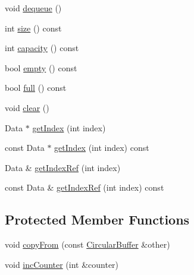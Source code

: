 \begin{CompactItemize}
\item 
void \hyperlink{class_j_g_t_l_1_1_circular_buffer_cd22f74b9be2e34fa6ac23358f0626d6}{dequeue} ()
\item 
int \hyperlink{class_j_g_t_l_1_1_circular_buffer_f107566d80cdecd1bd22af12cf9fe7e8}{size} () const
\item 
int \hyperlink{class_j_g_t_l_1_1_circular_buffer_1d45bb2d7be87cd4f64fdd687b4a8543}{capacity} () const
\item 
bool \hyperlink{class_j_g_t_l_1_1_circular_buffer_c810afb60a4a8ede12bd30640d4577c7}{empty} () const
\item 
bool \hyperlink{class_j_g_t_l_1_1_circular_buffer_29de08a95860346efcc84893aba71c73}{full} () const
\item 
void \hyperlink{class_j_g_t_l_1_1_circular_buffer_7c38e5b1c21dd3ab9c9e5b4f269ce3b8}{clear} ()
\item 
Data $\ast$ \hyperlink{class_j_g_t_l_1_1_circular_buffer_88a8bd26b61f87b6e22c33c3d6d120fb}{get\-Index} (int index)
\item 
const Data $\ast$ \hyperlink{class_j_g_t_l_1_1_circular_buffer_2f71fdf80cac6914e0886ed2a2118f7a}{get\-Index} (int index) const
\item 
Data \& \hyperlink{class_j_g_t_l_1_1_circular_buffer_fd58c9a7ff4ead948244b1ebd673ead9}{get\-Index\-Ref} (int index)
\item 
const Data \& \hyperlink{class_j_g_t_l_1_1_circular_buffer_34d6bb82f81427c2a3109dae072a1004}{get\-Index\-Ref} (int index) const
\end{CompactItemize}
\subsection*{Protected Member Functions}
\begin{CompactItemize}
\item 
void \hyperlink{class_j_g_t_l_1_1_circular_buffer_5dc9b80c3bcddc61b1c9cbcf88cf79bd}{copy\-From} (const \hyperlink{class_j_g_t_l_1_1_circular_buffer}{Circular\-Buffer} \&other)
\item 
void \hyperlink{class_j_g_t_l_1_1_circular_buffer_3fcdde5d44286f57f909b8e131eabe8b}{inc\-Counter} (int \&counter)
\end{CompactItemize}
